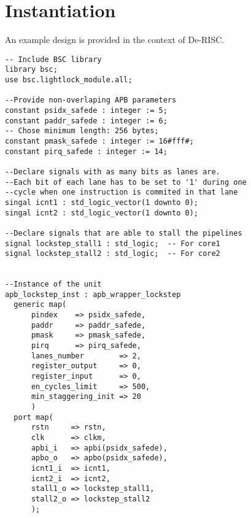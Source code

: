 \section{Instantiation}
An example design is provided in the context of De-RISC.
\\
\belowcaptionskip=-10pt
\begin{lstlisting}[label=ins-prot,caption=SafePMU instance example for gpp\_sys,style=vhdl]
-- Include BSC library
library bsc;
use bsc.lightlock_module.all;

--Provide non-overlaping APB parameters
constant psidx_safede : integer := 5;
constant paddr_safede : integer := 6;
-- Chose minimum length: 256 bytes;
constant pmask_safede : integer := 16#fff#;  
constant pirq_safede : integer := 14;

--Declare signals with as many bits as lanes are.
--Each bit of each lane has to be set to '1' during one 
--cycle when one instruction is commited in that lane
singal icnt1 : std_logic_vector(1 downto 0);
singal icnt2 : std_logic_vector(1 downto 0);

--Declare signals that are able to stall the pipelines
signal lockstep_stall1 : std_logic;  -- For core1
signal lockstep_stall2 : std_logic;  -- For core2


--Instance of the unit
apb_lockstep_inst : apb_wrapper_lockstep
  generic map(
      pindex    => psidx_safede,
      paddr     => paddr_safede,            
      pmask     => pmask_safede,
      pirq      => pirq_safede,
      lanes_number        => 2,
      register_output     => 0,
      register_input      => 0,
      en_cycles_limit     => 500,
      min_staggering_init => 20
      )
  port map(
      rstn     => rstn,
      clk      => clkm,
      apbi_i   => apbi(psidx_safede),
      apbo_o   => apbo(psidx_safede),
      icnt1_i  => icnt1, 
      icnt2_i  => icnt2, 
      stall1_o => lockstep_stall1,
      stall2_o => lockstep_stall2
      );

\end{lstlisting}



